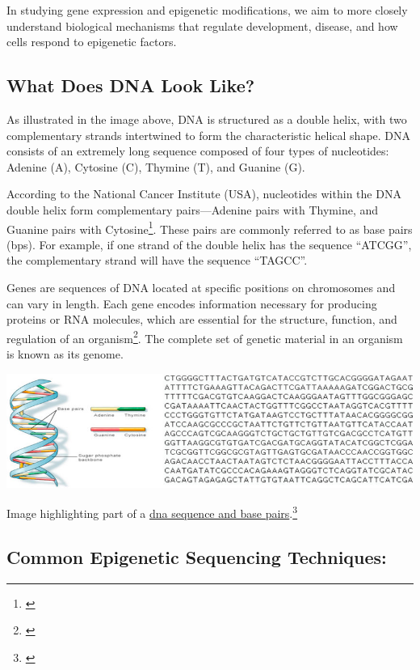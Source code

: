 \documentclass[
]{book}
\begin{document}
In studying gene expression and epigenetic modifications, we aim to more closely understand biological mechanisms that regulate development, disease, and how cells respond to epigenetic factors.

\subsection{What Does DNA Look Like?}\label{what-does-dna-look-like}

As illustrated in the image above, DNA is structured as a double helix, with two complementary strands intertwined to form the characteristic helical shape. DNA consists of an extremely long sequence composed of four types of nucleotides: Adenine (A), Cytosine (C), Thymine (T), and Guanine (G).

According to the National Cancer Institute (USA), nucleotides within the DNA double helix form complementary pairs---Adenine pairs with Thymine, and Guanine pairs with Cytosine\footnote{\citet{ncidefinitions}}. These pairs are commonly referred to as base pairs (bps). For example, if one strand of the double helix has the sequence ``ATCGG'', the complementary strand will have the sequence ``TAGCC''.

Genes are sequences of DNA located at specific positions on chromosomes and can vary in length. Each gene encodes information necessary for producing proteins or RNA molecules, which are essential for the structure, function, and regulation of an organism\footnote{\citet{ncidefinitions}}. The complete set of genetic material in an organism is known as its genome.

\includegraphics{images/dna_sequence.png}

Image highlighting part of a \href{https://www.researchgate.net/profile/Pratik-Kanani/publication/341901570/figure/fig1/AS:898621708984321@1591259519483/A-human-DNA-and-Part-of-DNA-sequence-28-29.jpg}{dna sequence and base pairs}.\footnote{\citet{kanani2020}}

\subsection{Common Epigenetic Sequencing Techniques:}\label{common-epigenetic-sequencing-techniques}
\end{document}
